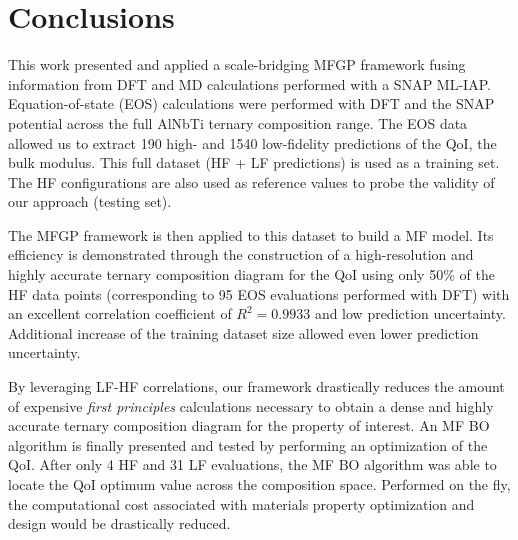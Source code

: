 \documentclass[%
 reprint,
aip,jcp
]{revtex4-1}
\begin{document}


\section{Conclusions}
\label{sec:Conclusion}

This work presented and applied a scale-bridging MFGP framework 
fusing information from DFT and MD calculations performed with a
SNAP ML-IAP. 
Equation-of-state (EOS) calculations were performed with DFT and 
the SNAP potential across the full AlNbTi ternary composition range. 
The EOS data allowed us to extract 190 high- and 1540 low-fidelity 
predictions of the QoI, the bulk modulus.
This full dataset (HF + LF predictions) is used as a 
training set. The HF configurations are also used as reference 
values to probe the validity of our approach (testing set).

The MFGP framework is then applied to this dataset to build a MF
model.
Its efficiency is demonstrated through the construction of a
high-resolution and highly accurate ternary composition diagram for the QoI
using only 50\% of the HF data points
(corresponding to 95 EOS evaluations performed with DFT) with an 
excellent correlation coefficient of $R^2 = 0.9933$ and low prediction uncertainty.
Additional increase of the training dataset size allowed even lower
prediction uncertainty.


By leveraging LF-HF correlations, our framework drastically
reduces the amount of expensive \emph{first principles}
calculations necessary to obtain a dense and  highly accurate ternary composition diagram for the property of interest. 
An MF BO algorithm is finally presented and tested by performing an
optimization of the QoI. 
After only 4 HF and 31 LF evaluations, the MF BO algorithm was able 
to locate the QoI optimum value across the composition space. 
Performed on the fly, the computational cost associated with materials 
property optimization and design would be drastically reduced.
\end{document}
